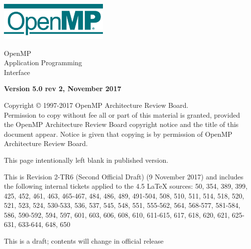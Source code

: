 
  \begin{titlepage}
    \begin{flushleft}
     \hspace{-6em} \includegraphics[width=0.4\textwidth]{openmp-logo.png}
    \end{flushleft}

    \begin{adjustwidth}{-0.75in}{0in}
    \begin{center}
      \Huge
      \textsf{OpenMP\\Application Programming\\Interface}

      \vspace{0.5in}\textsf{    }\vspace{-0.7in}
      \normalsize

      \vspace{1.0in}

      \textbf{Version 5.0 rev 2, November 2017}
    \end{center}
    \end{adjustwidth}

    \vspace{3.0in}

\begin{adjustwidth}{0pt}{1em}\setlength{\parskip}{0.25\baselineskip}%
Copyright © 1997-2017 OpenMP Architecture Review Board.\\
Permission to copy without fee all or part of this material is granted,
provided the OpenMP Architecture Review Board copyright notice and
the title of this document appear. Notice is given that copying is by
permission of OpenMP Architecture Review Board.\end{adjustwidth}

  \end{titlepage}


\clearpage
\thispagestyle{empty}
\phantom{a}
This page intentionally left blank in published version.

This is Revision 2-TR6 (Second Official Draft) (9 November 2017) and 
includes the following internal tickets applied to the 4.5 LaTeX sources: 
50, 354, 389, 399, 425, 452, 461, 463, 465-467, 484, 486, 489, 491-504, 
508, 510, 511, 514, 518, 520, 521, 523, 524, 530-533, 536, 537, 545, 548, 
551, 555-562, 564, 568-577, 581-584, 586, 590-592, 594, 597, 601, 603, 606, 
608, 610, 611-615, 617, 618, 620, 621, 625-631, 633-644, 648, 650

This is a draft; contents will change in official release

\vfill

